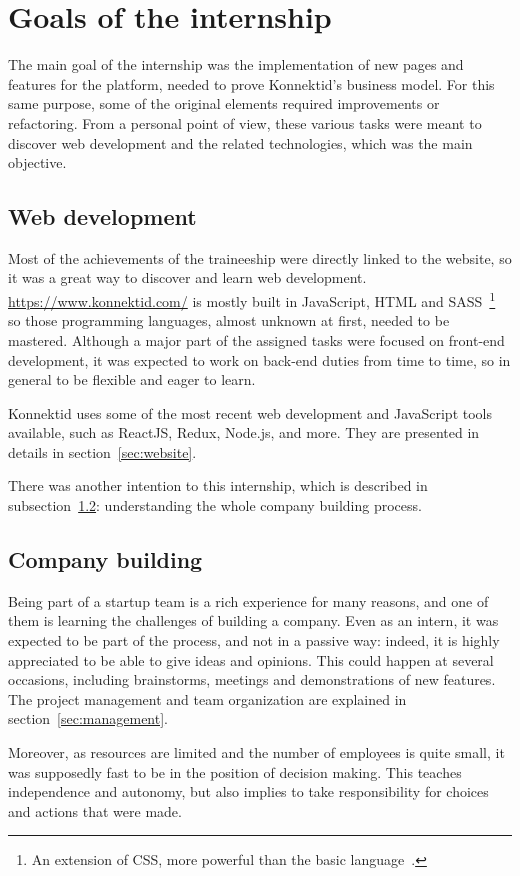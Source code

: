 \section{Goals of the internship}
\label{sec:goals}

The main goal of the internship was the implementation of new pages and features for the platform, needed to prove Konnektid's business model.
For this same purpose, some of the original elements required improvements or refactoring.
From a personal point of view, these various tasks were meant to discover web development and the related technologies, which was the main objective.

\subsection{Web development}
\label{ssec:web}

Most of the achievements of the traineeship were directly linked to the website, so it was a great way to discover and learn web development.
\url{https://www.konnektid.com/} is mostly built in JavaScript, HTML and SASS~\footnote{An extension of CSS, more powerful than the basic language~\cite{sass}.}
so those programming languages, almost unknown at first, needed to be mastered.
Although a major part of the assigned tasks were focused on front-end development,
it was expected to work on back-end duties from time to time, so in general to be flexible and eager to learn.

Konnektid uses some of the most recent web development and JavaScript tools available, such as ReactJS, Redux, Node.js, and more.
They are presented in details in {\sc section}~\ref{sec:website}.

There was another intention to this internship, which is described in {\sc subsection}~\ref{ssec:companyBuilding}:
understanding the whole company building process.

\subsection{Company building}
\label{ssec:companyBuilding}

Being part of a startup team is a rich experience for many reasons, and one of them is learning the challenges of building a company.
Even as an intern, it was expected to be part of the process, and not in a passive way:
indeed, it is highly appreciated to be able to give ideas and opinions.
This could happen at several occasions, including brainstorms, meetings and demonstrations of new features.
The project management and team organization are explained in {\sc section}~\ref{sec:management}.

Moreover, as resources are limited and the number of employees is quite small, it was supposedly fast to be in the position of decision making.
This teaches independence and autonomy, but also implies to take responsibility for choices and actions that were made.
